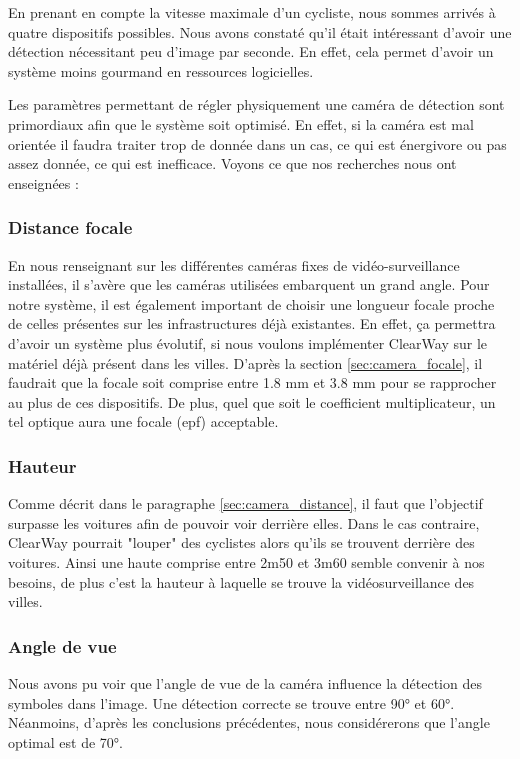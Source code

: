 En prenant en compte la vitesse maximale d'un cycliste, nous sommes arrivés à quatre dispositifs possibles. Nous avons constaté qu'il était intéressant
d'avoir une détection nécessitant peu d'image par seconde. En effet, cela permet d'avoir un système moins gourmand en ressources logicielles.

Les paramètres permettant de régler physiquement une caméra de détection sont primordiaux afin que le système soit optimisé.
En effet, si la caméra est mal orientée il faudra traiter trop de donnée dans un cas, ce qui est énergivore ou pas assez donnée, ce qui est inefficace.
Voyons ce que nos recherches nous ont enseignées :

\subsubsection*{Distance focale}
En nous renseignant sur les différentes caméras fixes de vidéo-surveillance installées, il s’avère que les caméras utilisées embarquent un grand angle.
Pour notre système, il est également important de choisir une longueur focale proche de celles présentes sur les infrastructures déjà existantes.
En effet, ça permettra d'avoir un système plus évolutif, si nous voulons implémenter ClearWay sur le matériel déjà présent dans les villes.
D'après la section \ref{sec:camera_focale}, il faudrait que la focale soit comprise entre 1.8 mm et 3.8 mm pour se rapprocher au plus de ces dispositifs.
De plus, quel que soit le coefficient multiplicateur, un tel optique aura une focale (\gls{epf}) acceptable.

\subsubsection*{Hauteur}

Comme décrit dans le paragraphe \ref{sec:camera_distance}, il faut que l'objectif surpasse les voitures afin de pouvoir voir derrière elles.
Dans le cas contraire, ClearWay pourrait "louper" des cyclistes alors qu'ils se trouvent derrière des voitures.
Ainsi une haute comprise entre 2m50 et 3m60 semble convenir à nos besoins, de plus c'est la hauteur à laquelle se trouve la vidéosurveillance des villes.

\subsubsection*{Angle de vue}
Nous avons pu voir que l'angle de vue de la caméra influence la détection des symboles dans l'image. Une détection correcte se trouve entre 90° et 60°.
Néanmoins, d'après les conclusions précédentes, nous considérerons que l'angle optimal est de 70°.

